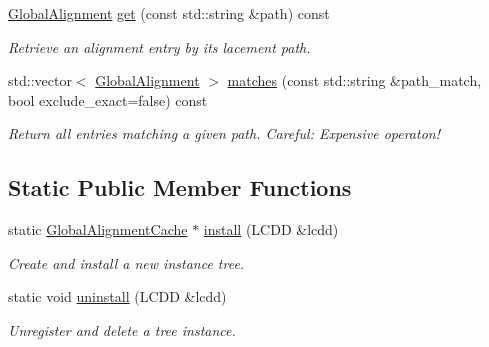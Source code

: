 \begin{DoxyCompactItemize}
\hyperlink{class_d_d4hep_1_1_alignments_1_1_global_alignment}{GlobalAlignment} \hyperlink{class_d_d4hep_1_1_alignments_1_1_global_alignment_cache_a0247dfc6d79fe30bdf7d133c72fe7149}{get} (const std::string \&path) const 
\begin{DoxyCompactList}\small\item\em Retrieve an alignment entry by its lacement path. \item\end{DoxyCompactList}\item 
std::vector$<$ \hyperlink{class_d_d4hep_1_1_alignments_1_1_global_alignment}{GlobalAlignment} $>$ \hyperlink{class_d_d4hep_1_1_alignments_1_1_global_alignment_cache_ace5ffe38851f6f6828f3bcd629406495}{matches} (const std::string \&path\_\-match, bool exclude\_\-exact=false) const 
\begin{DoxyCompactList}\small\item\em Return all entries matching a given path. Careful: Expensive operaton! \item\end{DoxyCompactList}\end{DoxyCompactItemize}
\subsection*{Static Public Member Functions}
\begin{DoxyCompactItemize}
\item 
static \hyperlink{class_d_d4hep_1_1_alignments_1_1_global_alignment_cache}{GlobalAlignmentCache} $\ast$ \hyperlink{class_d_d4hep_1_1_alignments_1_1_global_alignment_cache_a3ab52f93597d2c6facf29a0ecea5c7a2}{install} (LCDD \&lcdd)
\begin{DoxyCompactList}\small\item\em Create and install a new instance tree. \item\end{DoxyCompactList}\item 
static void \hyperlink{class_d_d4hep_1_1_alignments_1_1_global_alignment_cache_a8522b477a1db233bc330cc3c546dd9e7}{uninstall} (LCDD \&lcdd)
\begin{DoxyCompactList}\small\item\em Unregister and delete a tree instance. \item\end{DoxyCompactList}\end{DoxyCompactItemize}
